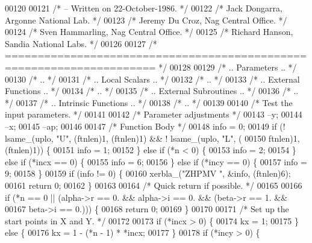\begin{DoxyCode}
00120 
00121 \textcolor{comment}{/*  -- Written on 22-October-1986. */}
00122 \textcolor{comment}{/*     Jack Dongarra, Argonne National Lab. */}
00123 \textcolor{comment}{/*     Jeremy Du Croz, Nag Central Office. */}
00124 \textcolor{comment}{/*     Sven Hammarling, Nag Central Office. */}
00125 \textcolor{comment}{/*     Richard Hanson, Sandia National Labs. */}
00126 
00127 \textcolor{comment}{/*  ===================================================================== */}
00128 
00129 \textcolor{comment}{/*     .. Parameters .. */}
00130 \textcolor{comment}{/*     .. */}
00131 \textcolor{comment}{/*     .. Local Scalars .. */}
00132 \textcolor{comment}{/*     .. */}
00133 \textcolor{comment}{/*     .. External Functions .. */}
00134 \textcolor{comment}{/*     .. */}
00135 \textcolor{comment}{/*     .. External Subroutines .. */}
00136 \textcolor{comment}{/*     .. */}
00137 \textcolor{comment}{/*     .. Intrinsic Functions .. */}
00138 \textcolor{comment}{/*     .. */}
00139 
00140 \textcolor{comment}{/*     Test the input parameters. */}
00141 
00142     \textcolor{comment}{/* Parameter adjustments */}
00143     --y;
00144     --x;
00145     --ap;
00146 
00147     \textcolor{comment}{/* Function Body */}
00148     info = 0;
00149     \textcolor{keywordflow}{if} (! lsame\_(uplo, \textcolor{stringliteral}{"U"}, (ftnlen)1, (ftnlen)1) && ! lsame\_(uplo, \textcolor{stringliteral}{"L"}, (
00150         ftnlen)1, (ftnlen)1)) \{
00151     info = 1;
00152     \} \textcolor{keywordflow}{else} \textcolor{keywordflow}{if} (*n < 0) \{
00153     info = 2;
00154     \} \textcolor{keywordflow}{else} \textcolor{keywordflow}{if} (*incx == 0) \{
00155     info = 6;
00156     \} \textcolor{keywordflow}{else} \textcolor{keywordflow}{if} (*incy == 0) \{
00157     info = 9;
00158     \}
00159     \textcolor{keywordflow}{if} (info != 0) \{
00160     xerbla\_(\textcolor{stringliteral}{"ZHPMV "}, &info, (ftnlen)6);
00161     \textcolor{keywordflow}{return} 0;
00162     \}
00163 
00164 \textcolor{comment}{/*     Quick return if possible. */}
00165 
00166     \textcolor{keywordflow}{if} (*n == 0 || (alpha->r == 0. && alpha->i == 0. && (beta->r == 1. && 
00167                                                          beta->i == 0.))) \{
00168     \textcolor{keywordflow}{return} 0;
00169     \}
00170 
00171 \textcolor{comment}{/*     Set up the start points in  X  and  Y. */}
00172 
00173     \textcolor{keywordflow}{if} (*incx > 0) \{
00174     kx = 1;
00175     \} \textcolor{keywordflow}{else} \{
00176     kx = 1 - (*n - 1) * *incx;
00177     \}
00178     \textcolor{keywordflow}{if} (*incy > 0) \{

\end{DoxyCode}
